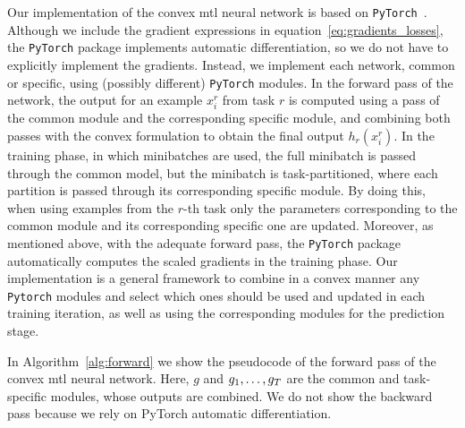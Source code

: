 Our implementation of the convex \acrshort{mtl} neural network is based on \texttt{PyTorch}~\citep{PyTorch}.
Although we include the gradient expressions in equation~\eqref{eq:gradients_losses}, the \texttt{PyTorch} package implements automatic differentiation, so we do not have to explicitly implement the gradients.
Instead, we implement each network, common or specific, using (possibly different) \texttt{PyTorch} modules.
In the forward pass of the network, the output for an example $x_i^r$ from task $r$ is computed using a pass of the common module and the corresponding specific module, and combining both passes with the convex formulation to obtain the final output $h_r(x_i^r)$.
In the training phase, in which minibatches are used, the full minibatch is passed through the common model, but the minibatch is task-partitioned, where each partition is passed through its corresponding specific module.
By doing this, when using examples from the $r$-th task only the parameters corresponding to the common module and its corresponding specific one are updated.
Moreover, as mentioned above, with the adequate forward pass, the \texttt{PyTorch} package automatically computes the scaled gradients in the training phase.
Our implementation is a general framework to combine in a convex manner any   \texttt{Pytorch} modules and select which ones should be used and updated in each training iteration, as well as using the corresponding modules for the prediction stage.

{In Algorithm~\ref{alg:forward} we show the pseudocode of the forward pass of the convex \acrshort{mtl} neural network. Here, $g$ and $g_1, \ldots, g_T$ are the common and task-specific modules, whose outputs are combined. We do not show the backward pass because we rely on PyTorch automatic differentiation.}



















